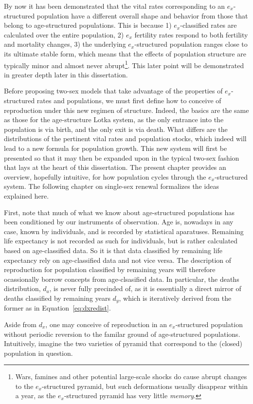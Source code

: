  \FloatBarrier
\label{sec:exstructuredrenewal}
By now it has been demonstrated that the vital rates corresponding to an
$e_x$-structured population have a different overall shape and behavior from
those that belong to age-structured populations. This is because 1) $e_x$-classified rates
are calculated over the entire population, 2) $e_x$ fertility rates respond to
both fertility and mortality changes, 3) the underlying $e_x$-structured
population ranges close to its ultimate stable form, which means that
the effects of population structure are typically minor and almost never
abrupt\footnote{Wars, famines and other potential large-scale shocks do cause
abrupt changes to the $e_x$-structured pyramid, but such deformations usually
disappear within a year, as the  $e_x$-structured pyramid has very little
\textit{memory}.}. This later point will be demonstrated in greater depth later
in this dissertation.

Before proposing two-sex models that take advantage of the properties of
$e_x$-structured rates and populations, we must first define how to conceive of
reproduction under this new regimen of structure. Indeed, the basics are the
same as those for the age-structure Lotka system, as the only entrance into the
population is via birth, and the only exit is via death. What differs are the
distributions of the pertinent vital rates and population stocks, which indeed
will lead to a new formula for population growth. This new system will first be
presented so that it may then be expanded upon in the typical two-sex fashion
that lays at the heart of this dissertation. The present chapter provides an
overview, hopefully intuitive, for how population cycles through the
$e_x$-structured system. The following chapter on single-sex renewal formalizes
the ideas explained here.

First, note that much of what we know about age-structured populations has been
conditioned by our instruments of observation. Age is, nowadays in any case,
known by individuals, and is recorded by statistical aparatuses. Remaining life
expectancy is not recorded as such for individuals, but is rather calculated
based on age-classified data. So it is that data classified by remaining
life expectancy rely on age-classified data and not vice versa. The description of 
reproduction for population classified by remaining years will therefore
ocassionally borrow concepts from age-clsasified data. In particular, the deaths
distribution, $d_a$, is never fully precinded of, as it is essentially a direct
mirror of deaths classified by remaining years $d_y$, which is
iteratively derived from the former as in Equation~\eqref{eq:dxredist}.

Aside from $d_x$, one may conceive of reproduction in an $e_x$-structured
population without periodic reversion to the familar ground of age-structured populations.
Intuitively, imagine the two varieties of pyramid that correspond to the
(closed) population in question. 